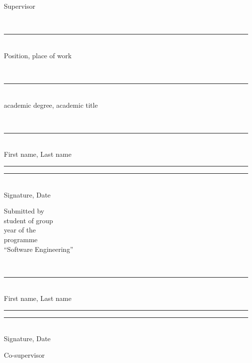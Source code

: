 \begin{titlepage}
\vspace{0.75cm}

\noindent
\begin{minipage}[t]{0.42\textwidth}
\raggedright
Supervisor

\vspace{0.18cm}
\strut\hseSupervisorTitle\\[-0.05cm]
\rule{6.1cm}{0.4pt}\\[-0.05cm]
{\scriptsize Position, place of work}

\vspace{0.08cm}
\strut\hseSupervisorDegree\\[-0.05cm]
\rule{6.1cm}{0.4pt}\\[-0.05cm]
{\scriptsize academic degree, academic title}

\vspace{0.08cm}
\strut\hseSupervisorName\\[-0.05cm]
\rule{6.1cm}{0.4pt}\\[-0.05cm]
{\scriptsize First name, Last name}

\vspace{0.08cm}
\rule{3.6cm}{0.4pt}\quad\rule{2.2cm}{0.4pt}\\[-0.05cm]
{\scriptsize Signature, Date}
\end{minipage}
\hfill
\begin{minipage}[t]{0.42\textwidth}
\raggedright
Submitted by\\
student of group \hseGroup\\
year \hseCourse{} of the \hseDegreeLevel\\
programme\\
\enquote{Software Engineering}

\vspace{0.25cm}
\strut\hseAuthorName\\[-0.05cm]
\rule{6.1cm}{0.4pt}\\[-0.05cm]
{\scriptsize First name, Last name}

\vspace{0.18cm}
\rule{3.6cm}{0.4pt}\quad\rule{2.2cm}{0.4pt}\\[-0.05cm]
{\scriptsize Signature, Date}
\end{minipage}

\ifhseHasCoSupervisor
\vspace{0.35cm}

\noindent
\begin{minipage}[t]{0.42\textwidth}
\raggedright
Co-supervisor


\end{minipage}
\end{titlepage}

